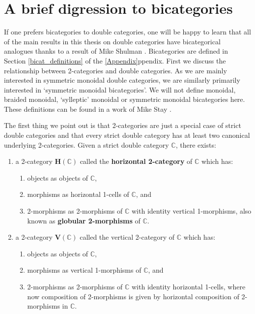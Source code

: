 \documentclass[oneside,final]{ucr}
\theoremstyle{definition}
\newcommand{\define}[1]{{\bf \boldmath #1}}
\begin{document}
{\ssp
\chapter{A brief digression to bicategories}\label{Chapter5}
If one prefers bicategories to double categories, one will be happy to learn that all of the main results in this thesis on double categories have bicategorical analogues thanks to a result of Mike Shulman \cite{Shul}. Bicategories are defined in Section \ref{bicat_definitions} of the \ref{Appendix}ppendix. First we discuss the relationship between 2-categories and double categories. As we are mainly interested in symmetric monoidal double categories, we are similarly primarily interested in `symmetric monoidal bicategories'. We will not define monoidal, braided monoidal, `sylleptic' monoidal or symmetric monoidal bicategories here. These definitions can be found in a work of Mike Stay \cite{Stay}.

The first thing we point out is that 2-categories are just a special case of strict double categories and that every strict double category has at least two canonical underlying 2-categories. Given a strict double category $\mathbb{C}$, there exists:
\begin{enumerate}
\item{a 2-category $\mathbf{H}(\mathbb{C})$ called the \define{horizontal 2-category} of $\mathbb{C}$ which has:
\begin{enumerate}
\item objects as objects of $\mathbb{C}$,
\item morphisms as horizontal 1-cells of $\mathbb{C}$, and
\item 2-morphisms as 2-morphisms of $\mathbb{C}$ with identity vertical 1-morphisms, also known as \define{globular 2-morphisms} of $\mathbb{C}$.
\end{enumerate}}
\item{a 2-category $\mathbf{V}(\mathbb{C})$ called the vertical 2-category of $\mathbb{C}$ which has:
\begin{enumerate}
\item objects as objects of $\mathbb{C}$,
\item morphisms as vertical 1-morphisms of $\mathbb{C}$, and
\item 2-morphisms as 2-morphisms of $\mathbb{C}$ with identity horizontal 1-cells, where now composition of 2-morphisms is given by horizontal composition of 2-morphisms in $\mathbb{C}$.
\end{enumerate}}
\end{enumerate}


}
\end{document}
